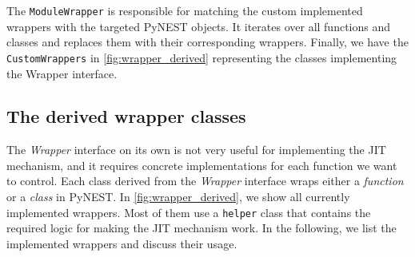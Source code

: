 The \texttt{ModuleWrapper} is responsible for matching the custom implemented wrappers with the targeted PyNEST objects. It iterates over all functions and classes and replaces them with their corresponding wrappers. Finally, we have the \texttt{CustomWrappers} in \autoref{fig:wrapper_derived} representing the classes implementing the Wrapper interface.

\subsection{The derived wrapper classes}

The \emph{Wrapper} interface on its own is not very useful for implementing the JIT mechanism, and it requires concrete implementations for each function we want to control. Each class derived from the \emph{Wrapper} interface wraps either a \emph{function} or a \emph{class} in PyNEST. In \autoref{fig:wrapper_derived}, we show all currently implemented wrappers. Most of them use a \texttt{helper} class that contains the required logic for making the JIT mechanism work. In the following, we list the implemented wrappers and discuss their usage.

